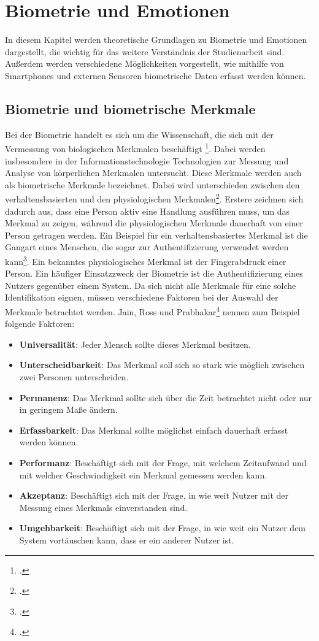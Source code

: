 \section{Biometrie und Emotionen}
In diesem Kapitel werden theoretische Grundlagen zu Biometrie und Emotionen dargestellt, die wichtig für das weitere Verständnis der Studienarbeit sind. Außerdem werden verschiedene Möglichkeiten vorgestellt, wie mithilfe von Smartphones und externen Sensoren biometrische Daten erfasst werden können.
\subsection{Biometrie und biometrische Merkmale}
\label{section:Biometrie}
Bei der Biometrie handelt es sich um die Wissenschaft, die sich mit der Vermessung von biologischen Merkmalen beschäftigt \footcite[Vgl.][]{Sea18}. Dabei werden insbesondere in der Informationstechnologie Technologien zur Messung und Analyse von körperlichen Merkmalen untersucht.\newline
Diese Merkmale werden auch als biometrische Merkmale bezeichnet. Dabei wird unterschieden zwischen den verhaltensbasierten und den physiologischen Merkmalen\footcite[Vgl. ][]{Sas06}. Erstere zeichnen sich dadurch aus, dass eine Person aktiv eine Handlung ausführen muss, um das Merkmal zu zeigen, während die physiologischen Merkmale dauerhaft von einer Person getragen werden. Ein Beispiel für ein verhaltensbasiertes Merkmal ist die Gangart eines Menschen, die sogar zur Authentifizierung verwendet werden kann\footcite[Vgl. ][]{Cla09}. Ein bekanntes physiologisches Merkmal ist der Fingerabdruck einer Person.\newline
Ein häufiger Einsatzzweck der Biometrie ist die Authentifizierung eines Nutzers gegenüber einem System. Da sich nicht alle Merkmale für eine solche Identifikation eignen, müssen verschiedene Faktoren bei der Auswahl der Merkmale betrachtet werden. Jain, Ross und Prabhakar\footcite[Vgl. ][S.2]{Akj04} nennen zum Beispiel folgende Faktoren: 
\begin{itemize}
	\item \textbf{Universalität}: Jeder Mensch sollte dieses Merkmal besitzen.
	\item \textbf{Unterscheidbarkeit}: Das Merkmal soll sich so stark wie möglich zwischen zwei Personen unterscheiden.
	\item \textbf{Permanenz}: Das Merkmal sollte sich über die Zeit betrachtet nicht oder nur in geringem Maße ändern.
	\item \textbf{Erfassbarkeit}: Das Merkmal sollte möglichst einfach dauerhaft erfasst werden können.
	\item \textbf{Performanz}: Beschäftigt sich mit der Frage, mit welchem Zeitaufwand und mit welcher Geschwindigkeit ein Merkmal gemessen werden kann. 
	\item \textbf{Akzeptanz}: Beschäftigt sich mit der Frage, in wie weit Nutzer mit der Messung eines Merkmals einverstanden sind. 
	\item \textbf{Umgehbarkeit}: Beschäftigt sich mit der Frage, in wie weit ein Nutzer dem System vortäuschen kann, dass er ein anderer Nutzer ist.
\end{itemize}
